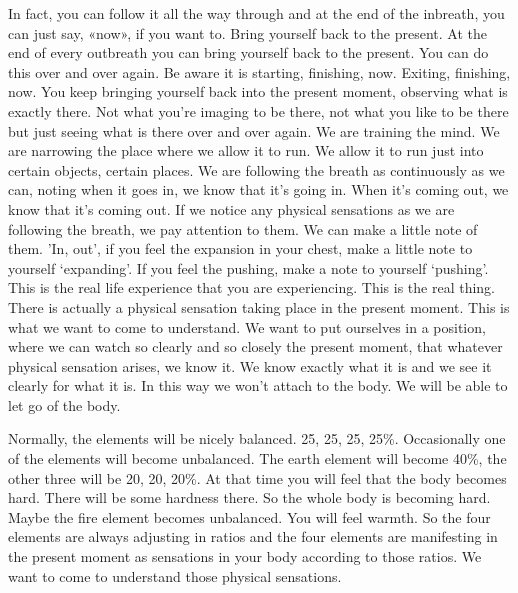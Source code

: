 \documentclass[letterpaper,10pt,english]{sphinxmanual}
\begin{document}
\sphinxAtStartPar
In fact, you can follow it all the way through and at the end of the inbreath, you can just say, «now», if you want to. Bring yourself back to the
present. At the end of every out\sphinxhyphen{}breath you can bring yourself back to the
present. You can do this over and over again. Be aware it is starting, finishing, now. Exiting, finishing, now. You keep bringing yourself back into the
present  moment,  observing  what  is  exactly  there.  Not  what  you’re  imaging to be there, not what you like to be there but just seeing what is there
over and over again. We are training the mind. We are narrowing the place
where we allow it to run. We allow it to run just into certain objects, certain
places. We are following the breath as continuously as we can, noting when
it goes in, we know that it’s going in. When it’s coming out, we know that
it’s  coming  out.  If  we  notice  any  physical  sensations  as  we  are  following
the breath, we pay attention to them. We can make a little note of them. ’In,
out’, if you feel the expansion in your chest, make a little note to yourself
‘expanding’. If you feel the pushing, make a note to yourself ‘pushing’. This
is the real life experience that you are experiencing. This is the real thing.
There is actually a physical sensation taking place in the present moment.
This is what we want to come to understand. We want to put ourselves in a
position, where we can watch so clearly and so closely the present moment,
that whatever physical sensation arises, we know it. We know exactly what it
is and we see it clearly for what it is. In this way we won’t attach to the body.
We will be able to let go of the body.

\sphinxAtStartPar
Normally, the elements will be nicely balanced. 25, 25, 25, 25\%. Occasionally one of the elements will become unbalanced. The earth element will
become 40\%, the other three will be 20, 20, 20\%. At that time you will feel
that the body becomes hard. There will be some hardness there. So the whole
body is becoming hard. Maybe the fire element becomes unbalanced. You
will feel warmth. So the four elements are always adjusting in ratios and the
four elements are manifesting in the present moment as sensations in your
  body according to those ratios. We want to come to understand those physical sensations.
\end{document}
